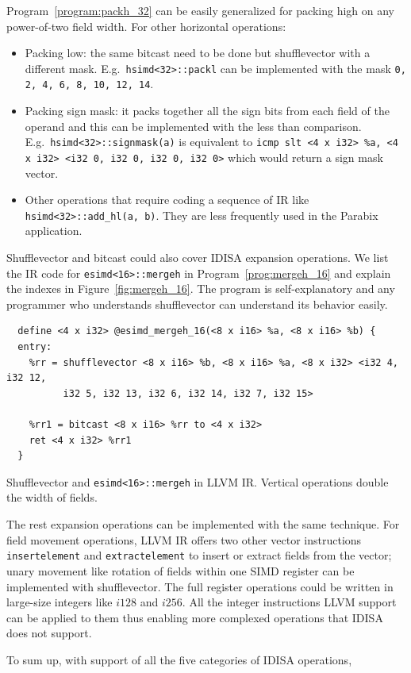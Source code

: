 Program~\ref{program:packh_32} can be easily generalized for packing high on any power-of-two field width. For other horizontal operations:
\begin{itemize}
    \item Packing low: the same bitcast need to be done but shufflevector with a different mask. E.g.\ {\tt hsimd<32>::packl} can be implemented with the mask {\tt 0, 2, 4, 6, 8, 10, 12, 14}.
    \item Packing sign mask: it packs together all the sign bits from each field of the operand and this can be implemented with the less than comparison. E.g.\ {\tt hsimd<32>::signmask(a)} is equivalent to \verb|icmp slt <4 x i32> %a, <4 x i32> <i32 0, i32 0, i32 0, i32 0>| which would return a {\tt <4 x i1>} sign mask vector.
    \item Other operations that require coding a sequence of IR like {\tt hsimd<32>::add\_hl(a, b)}. They are less frequently used in the Parabix application.
\end{itemize}

Shufflevector and bitcast could also cover IDISA expansion operations. We list the IR code for {\tt esimd<16>::mergeh} in Program~\ref{prog:mergeh_16} and explain the indexes in Figure~\ref{fig:mergeh_16}. The program is self-explanatory and any programmer who understands shufflevector can understand its behavior easily.

\begin{program}
\begin{verbatim}
  define <4 x i32> @esimd_mergeh_16(<8 x i16> %a, <8 x i16> %b) {
  entry:
    %rr = shufflevector <8 x i16> %b, <8 x i16> %a, <8 x i32> <i32 4, i32 12,
          i32 5, i32 13, i32 6, i32 14, i32 7, i32 15>

    %rr1 = bitcast <8 x i16> %rr to <4 x i32>
    ret <4 x i32> %rr1
  }
\end{verbatim}
\caption[Shufflevector implementation of mergeh.]{Shufflevector and {\tt esimd<16>::mergeh} in LLVM IR\@. Vertical operations double the width of fields.}
\label{prog:mergeh_16}
\end{program}

The rest expansion operations can be implemented with the same technique. For field movement operations, LLVM IR offers two other vector instructions {\tt insertelement} and {\tt extractelement} to insert or extract fields from the vector; unary movement like rotation of fields within one SIMD register can be implemented with shufflevector. The full register operations could be written in large-size integers like $i128$ and $i256$. All the integer instructions LLVM support can be applied to them thus enabling more complexed operations that IDISA does not support.

To sum up, with support of all the five categories of IDISA operations,
